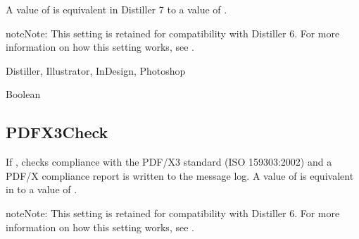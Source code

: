 \documentclass[letterpaper,12pt,english,openany,oneside]{sphinxmanual}
\begin{document}
A value of  is equivalent in Distiller 7 to a value of  .

\begin{sphinxadmonition}{note}{Note:}
This setting is retained for compatibility with Distiller 6. For more information on how this setting works, see .
\end{sphinxadmonition}
\label{\detokenize{PDF_Create_CommonSettings:supported-by-109}}

Distiller, Illustrator, InDesign, Photoshop

\label{\detokenize{PDF_Create_CommonSettings:type-108}}

Boolean

\label{\detokenize{PDF_Create_CommonSettings:ui-name-90}}


\label{\detokenize{PDF_Create_CommonSettings:default-value-103}}

\begin{sphinxVerbatim}[commandchars=\\\{\}]
\end{sphinxVerbatim}




\subsection{PDFX3Check}
\label{\detokenize{PDF_Create_CommonSettings:pdfx3check}}
If  , checks compliance with the PDF/X\sphinxhyphen{}3 standard (ISO 15930\sphinxhyphen{}3:2002) and a PDF/X compliance report is written to the message log. A value of  is equivalent in to a value of  .

\begin{sphinxadmonition}{note}{Note:}
This setting is retained for compatibility with Distiller 6. For more information on how this setting works, see .
\end{sphinxadmonition}
\label{\detokenize{PDF_Create_CommonSettings:supported-by-110}}
\end{document}

